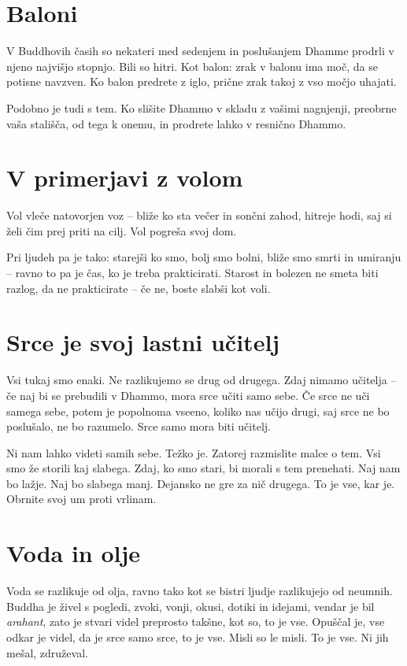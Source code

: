 \section{Baloni}

V Buddhovih časih so nekateri med sedenjem in poslušanjem Dhamme prodrli v njeno najvišjo stopnjo. Bili so hitri. Kot balon: zrak v balonu ima moč, da se potisne navzven. Ko balon predrete z iglo, prične zrak takoj z vso močjo uhajati.

Podobno je tudi s tem. Ko slišite Dhammo v skladu z vašimi nagnjenji, preobrne vaša stališča, od tega k onemu, in prodrete lahko v resnično Dhammo.

\section{V primerjavi z volom}

Vol vleče natovorjen voz – bliže ko sta večer in sončni zahod, hitreje hodi, saj si želi čim prej priti na cilj. Vol pogreša svoj dom.

Pri ljudeh pa je tako: starejši ko smo, bolj smo bolni, bliže smo smrti in umiranju – ravno to pa je čas, ko je treba prakticirati. Starost in bolezen ne smeta biti razlog, da ne prakticirate – če ne, boste slabši kot voli.

\section{Srce je svoj lastni učitelj}

Vsi tukaj smo enaki. Ne razlikujemo se drug od drugega. Zdaj nimamo učitelja – če naj bi se prebudili v Dhammo, mora srce učiti samo sebe. Če srce ne uči samega sebe, potem je popolnoma vseeno, koliko nas učijo drugi, saj srce ne bo poslušalo, ne bo razumelo. Srce samo mora biti učitelj.

Ni nam lahko videti samih sebe. Težko je. Zatorej razmislite malce o tem. Vsi smo že storili kaj slabega. Zdaj, ko smo stari, bi morali s tem prenehati. Naj nam bo lažje. Naj bo slabega manj. Dejansko ne gre za nič drugega. To je vse, kar je. Obrnite svoj um proti vrlinam.

\section{Voda in olje}

Voda se razlikuje od olja, ravno tako kot se bistri ljudje razlikujejo od neumnih. Buddha je živel s pogledi, zvoki, vonji, okusi, dotiki in idejami, vendar je bil \emph{arahant}, zato je stvari videl preprosto takšne, kot so, to je vse. Opuščal je, vse odkar je videl, da je srce samo srce, to je vse. Misli so le misli. To je vse. Ni jih mešal, združeval.

